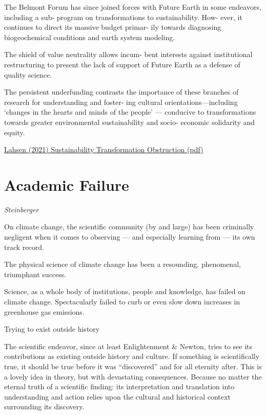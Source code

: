 \documentclass[
]{book}
\begin{document}
The Belmont Forum has since joined forces with
Future Earth in some endeavors, including a sub-
program on transformations to sustainability. How-
ever, it continues to direct its massive budget primar-
ily towards diagnosing biogeochemical conditions
and earth system modeling.

The shield of value neutrality allows incum-
bent interests against institutional restructuring to
present the lack of support of Future Earth as a
defense of quality science.

The persistent underfunding contrasts the importance of these
branches of research for understanding and foster-
ing cultural orientations---including `changes in the
hearts and minds of the people' --- conducive to transformations towards
greater environmental sustainability and socio-
economic solidarity and equity.

\href{pdf/Lahsen_2021_Sustainability_Obstruction.pdf}{Lahsen (2021) Sustainability Transformation Obstruction (pdf)}

\hypertarget{academic-failure}{%
\chapter{Academic Failure}\label{academic-failure}}

\emph{Steinberger}

On climate change, the scientific community (by and large) has been criminally negligent when it comes to observing --- and especially learning from --- its own track record.

The physical science of climate change has been a resounding, phenomenal, triumphant success.

Science, as a whole body of institutions, people and knowledge, has failed on climate change.
Spectacularly failed to curb or even slow down increases in greenhouse gas emissions.

Trying to exist outside history

The scientific endeavor, since at least Enlightenment \& Newton, tries to see its contributions as existing outside history and culture. If something is scientifically true, it should be true before it was ``discovered'' and for all eternity after. This is a lovely idea in theory, but with devastating consequences. Because no matter the eternal truth of a scientific finding: its interpretation and translation into understanding and action relies upon the cultural and historical context surrounding its discovery.
\end{document}
